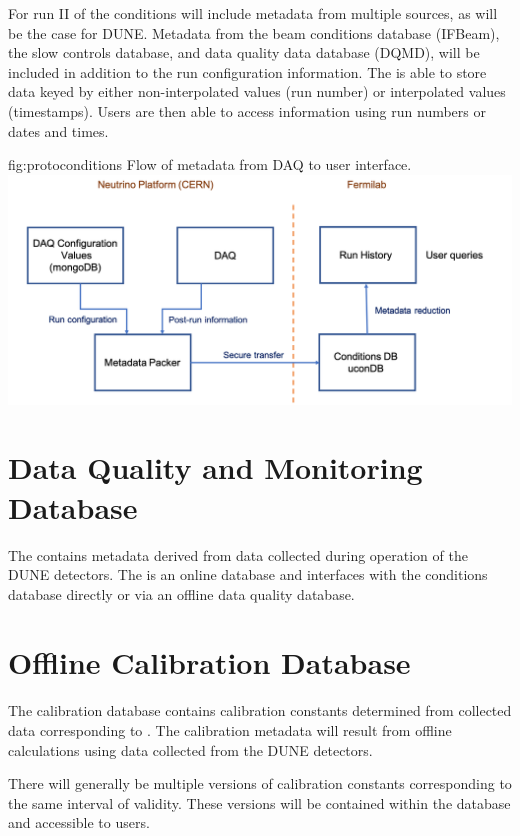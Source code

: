 \documentclass[../main-v1.tex]{subfiles}
\begin{document}
For run II of  the conditions  will include metadata from multiple sources, as will be the case for DUNE. Metadata from the beam conditions database (IFBeam), the slow controls database, and data quality data database (DQMD), will be included in addition to the run configuration information. The  is able to store data keyed by either non-interpolated values (run number) or interpolated values (timestamps). Users are then able to access information using run numbers or dates and times.


\begin{dunefigure}
{fig:protoconditions} 
{Flow of metadata from  DAQ to user interface.}
\includegraphics[width=.9\columnwidth]{graphics/Databases/Conditions_ProtoDUNE.png}
\end{dunefigure}

\section{Data Quality and Monitoring Database}
\label{sec:db:dqm}  

The  contains metadata derived from data collected during operation of the DUNE detectors. The   is an online database and interfaces with the conditions database directly or via an offline data quality database.

\section{Offline Calibration Database}
\label{sec:db:calib} 

The calibration database contains calibration constants determined from collected data corresponding to  . The calibration metadata will result from offline calculations using data collected from the DUNE detectors.

There will generally be multiple versions of calibration constants corresponding to the same interval of validity. These versions will be contained within the database and accessible to users.  
\end{document}
